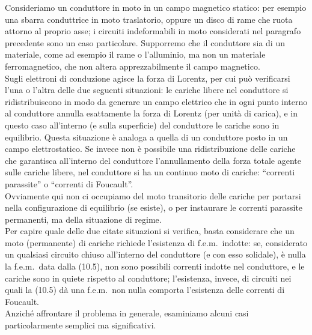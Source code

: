 Consideriamo un conduttore in moto in un campo magnetico statico: per esempio
una sbarra conduttrice in moto traslatorio, oppure un disco di rame che ruota
attorno al proprio asse; i circuiti indeformabili in moto considerati nel
paragrafo precedente sono un caso particolare. Supporremo che il conduttore sia
di un materiale, come ad esempio il rame o l'alluminio, ma non un materiale
ferromagnetico, che non altera apprezzabilmente il campo magnetico.\\
Sugli elettroni di conduzione agisce la forza di Lorentz, per cui pu\`o
verificarsi l'una o l'altra delle due seguenti situazioni: le cariche libere nel
conduttore si ridistribuiscono in modo da generare un campo elettrico che in
ogni punto interno al conduttore annulla esattamente la forza di Lorentz (per
unit\`a di carica), e in questo caso all'interno (e sulla superficie) del
conduttore le cariche sono in equilibrio. Questa situazione \`e analoga a quella
di un conduttore posto in un campo elettrostatico. Se invece non \`e possibile
una ridistribuzione delle cariche che garantisca all'interno del conduttore
l'annullamento della forza totale agente sulle cariche libere, nel conduttore si
ha un continuo moto di cariche: ``correnti parassite'' o ``correnti di
Foucault''.\\
Ovviamente qui non ci occupiamo del moto transitorio delle cariche per portarsi
nella configurazione di equilibrio (se esiste), o per instaurare le correnti
parassite permanenti, ma della situazione di regime.\\
Per capire quale delle due citate situazioni si verifica, basta considerare che
un moto (permanente) di cariche richiede l'esistenza di f.e.m.\ indotte: se,
considerato un qualsiasi circuito chiuso all'interno del conduttore (e con esso
solidale), \`e nulla la f.e.m.\ data dalla (10.5), non sono possibili correnti
indotte nel conduttore, e le cariche sono in quiete rispetto al conduttore;
l'esistenza, invece, di circuiti nei quali la (10.5) d\`a una f.e.m.\ non nulla
comporta l'esistenza delle correnti di Foucault.\\
Anzich\'e affrontare il problema in generale, esaminiamo alcuni casi
particolarmente semplici ma significativi.

